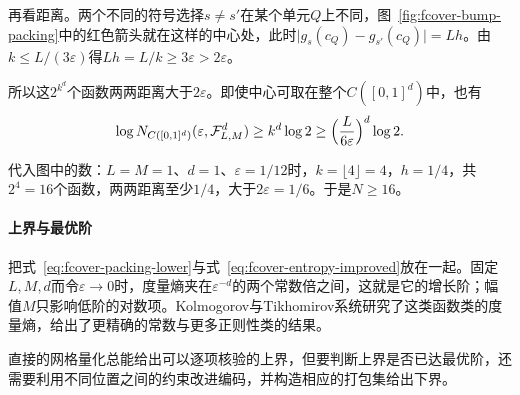 再看距离。两个不同的符号选择$s\neq s'$在某个单元$Q$上不同，图~\ref{fig:fcover-bump-packing}中的红色箭头就在这样的中心处，此时$\lvert g_s(c_Q)-g_{s'}(c_Q)\rvert=Lh$。由$k\leq L/(3\varepsilon)$得$Lh=L/k\geq3\varepsilon>2\varepsilon$。

所以这$2^{k^d}$个函数两两距离大于$2\varepsilon$。即使中心可取在整个$C([0,1]^d)$中，也有
\begin{equation}
 \log N_{C([0,1]^d)}(\varepsilon,\mathcal F^d_{L,M})\geq k^d\log2\geq\Bigl(\frac L{6\varepsilon}\Bigr)^d\log2 .
 \label{eq:fcover-packing-lower}
\end{equation}

代入图中的数：$L=M=1$、$d=1$、$\varepsilon=1/12$时，$k=\lfloor4\rfloor=4$，$h=1/4$，共$2^4=16$个函数，两两距离至少$1/4$，大于$2\varepsilon=1/6$。于是$N\geq16$。

\paragraph{上界与最优阶}

把式~\eqref{eq:fcover-packing-lower}与式~\eqref{eq:fcover-entropy-improved}放在一起。固定$L,M,d$而令$\varepsilon\to0$时，度量熵夹在$\varepsilon^{-d}$的两个常数倍之间，这就是它的增长阶；幅值$M$只影响低阶的对数项。Kolmogorov与Tikhomirov系统研究了这类函数类的度量熵，给出了更精确的常数与更多正则性类的结果。

直接的网格量化总能给出可以逐项核验的上界，但要判断上界是否已达最优阶，还需要利用不同位置之间的约束改进编码，并构造相应的打包集给出下界。
